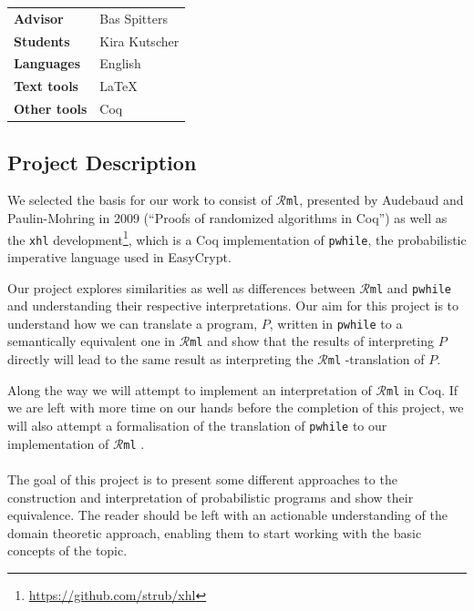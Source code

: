 \documentclass{article}
\begin{document}
\pagestyle{fancy}
\newcommand\rml{$\mathcal{R}$\texttt{ml} }
\newcommand\rmlno{$\mathcal{R}$\texttt{ml}}

\bgroup{}
\begin{table}[h]
\begin{tabular}{ll}
\textbf{Advisor}     & Bas Spitters     \\
\textbf{Students}    & Kira Kutscher    \\
\textbf{Languages}   & English          \\
\textbf{Text tools}  & \LaTeX           \\
\textbf{Other tools} & Coq              
\end{tabular}
\end{table}
\egroup\vspace{-0.cm}

\subsection*{Project Description}
We selected the basis for our work to consist of \rmlno, presented by Audebaud and
Paulin-Mohring in 2009 (``Proofs of randomized algorithms in Coq'') as well as the
\texttt{xhl} development\footnote{\url{https://github.com/strub/xhl}}, which is a Coq
implementation of \texttt{pwhile}, the probabilistic imperative language used in
EasyCrypt.

Our project explores similarities as well as differences between \rml and
\texttt{pwhile} and understanding their respective interpretations. Our aim for this
project is to understand how we can translate a program, $P$, written in
\texttt{pwhile} to a semantically equivalent one in \rml and show that the results of
interpreting $P$ directly will lead to the same result as interpreting the \rmlno
-translation of $P$. 

Along the way we will attempt to implement an interpretation of \rml in Coq. If we
are left with more time on our hands before the completion of this project, we will
also attempt a formalisation of the translation of \texttt{pwhile} to our
implementation of \rml. 
\\ \\
The goal of this project is to present some different approaches to the construction
and interpretation of probabilistic programs and show their equivalence. The reader
should be left with an actionable understanding of the domain theoretic approach,
enabling them to start working with the basic concepts of the topic. 
\end{document}
